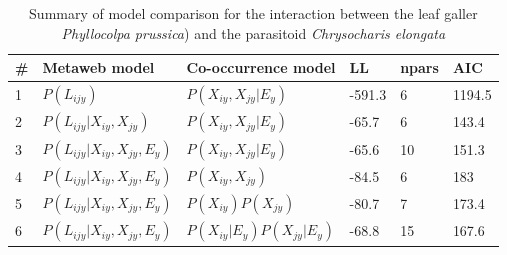 \documentclass[12pt]{article}
\begin{document}
\newpage



\newpage

\begin{landscape}
\begin{table}[]
\centering
\caption{Summary of model comparison for the interaction between the leaf
galler \textit{Phyllocolpa prussica}) and the parasitoid \textit{Chrysocharis
elongata}}
\begin{tabular}{llllll}
\hline
	\# & Metaweb model 						& Co-occurrence model 			& LL 	& npars & AIC \\ \hline
	1 & $P(L_{ijy})$ 						& $P(X_{iy},X_{jy}|E_y)$ 		& -591.3 & 6 	& 1194.5 \\
	2 & $P(L_{ijy} | X_{iy}, X_{jy})$ 		& $P(X_{iy},X_{jy}|E_y)$ 		& -65.7 & 6 	& 143.4 \\
	3 & $P(L_{ijy} | X_{iy}, X_{jy}, E_y)$ & $P(X_{iy},X_{jy}|E_y)$ 		& -65.6 & 10 	& 151.3 \\ \hline
	4 & $P(L_{ijy} | X_{iy}, X_{jy}, E_y)$ & $P(X_{iy},X_{jy})$ 			& -84.5 & 6 	& 183 \\
	5 & $P(L_{ijy} | X_{iy}, X_{jy}, E_y)$ & $P(X_{iy})P(X_{jy})$ 			& -80.7 & 7 	& 173.4 \\
	6 & $P(L_{ijy} | X_{iy}, X_{jy}, E_y)$ & $P(X_{iy}|E_y)P(X_{jy}|E_y)$ 	& -68.8 & 15 	& 167.6 \\
\hline
\end{tabular}
\end{table}
\end{landscape}

\newpage
\end{document}
